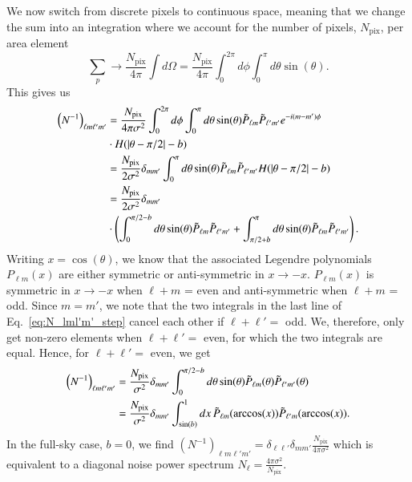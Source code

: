 \documentclass[twocolumn]{../common/aa}
\begin{document}
We now switch from discrete pixels to continuous space, meaning that we change the sum into an integration where we account for the number of pixels, $N_{\mathrm{pix}}$, per area element
\begin{equation}
\sum_p \rightarrow \frac{N_{\mathrm{pix}}}{4\pi}\int d\Omega  = \frac{N_{\mathrm{pix}}}{4\pi}\int_{0}^{2\pi} d\phi \int_{0}^{\pi} d\theta \sin(\theta).
\end{equation}
This gives us
\begin{align}
\nonumber
\left(N^{-1}\right)_{\ell m \ell' m'} &= \frac{N_{\mathrm{pix}}}{4\pi \sigma^2}\int_{0}^{2\pi} d\phi \int_{0}^{\pi} d\theta \sin(\theta)\Tilde{P}_{\ell m}  \Tilde{P}_{\ell' m'}  e^{-i(m-m')\phi}
\\
\nonumber
&\cdot H(|\theta -\pi/2|-b)\\
\nonumber
&= \frac{N_{\mathrm{pix}}}{2\sigma^2} \delta_{mm'}\int_{0}^{\pi} d\theta \sin(\theta)\Tilde{P}_{\ell m}  \Tilde{P}_{\ell' m'} H(|\theta -\pi/2|-b)\\
\nonumber
&= \frac{N_{\mathrm{pix}}}{2\sigma^2} \delta_{mm'}\\
\label{eq:N_lml'm'_step}
&\cdot \left(\int_{0}^{\pi/2-b} d\theta \sin(\theta) \Tilde{P}_{\ell m}  \Tilde{P}_{\ell' m'}+\int_{\pi/2+b}^{\pi} d\theta \sin(\theta)\Tilde{P}_{\ell m}  \Tilde{P}_{\ell' m'}\right).
\end{align}
Writing $x=\cos(\theta)$, we know that the associated Legendre polynomials $P_{\ell m}(x)$ are either symmetric or anti-symmetric in $x\rightarrow-x$. $P_{\ell m}(x)$ is symmetric in $x \rightarrow -x$ when $\ell+m$ = even and anti-symmetric when $\ell+m$ = odd. Since $m=m'$, we note that the two integrals in the last line of Eq.~\eqref{eq:N_lml'm'_step} cancel each other if $\ell+\ell' =$ odd. We, therefore, only get non-zero elements when $\ell + \ell' =$ even, for which the two integrals are equal. Hence, for $\ell + \ell'=$ even, we get
\begin{align}
\nonumber
\left(N^{-1}\right)_{\ell m \ell' m'} &= \frac{N_{\mathrm{pix}}}{\sigma^2} \delta_{mm'}\int_{0}^{\pi/2-b} d\theta \sin(\theta)\Tilde{P}_{\ell m}(\theta)\Tilde{P}_{\ell' m'}(\theta)\\
\label{eq:finished_n_inv}
&=\frac{N_{\mathrm{pix}}}{\sigma^2} \delta_{mm'}\int_{\sin(b)}^{1} dx \, \Tilde{P}_{\ell m}(\arccos(x)) \Tilde{P}_{\ell' m}(\arccos(x)).
\end{align}
In the full-sky case, $b=0$, we find $\left(N^{-1}\right)_{\ell m \ell' m'} = \delta_{\ell \ell'}\delta_{mm'}\frac{N_{\mathrm{pix}}}{4\pi \sigma^2}$ which is equivalent to a diagonal noise power spectrum ${N_{\ell} = \frac{4\pi\sigma^2}{N_{\mathrm{pix}}}}$.
\end{document}

